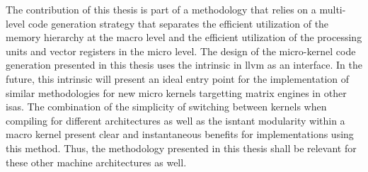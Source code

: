 \documentclass[\main/thesis.tex]{subfiles}
\begin{document}
The contribution of this thesis is part of a methodology that relies on a multi-level code generation strategy that separates the efficient utilization of the memory hierarchy at the macro level and the efficient utilization of the processing units and vector registers in the micro level.
The design of the micro-kernel code generation presented in this thesis uses the  \gls{intrinsic} in \gls{llvm} as an interface.
In the future, this intrinsic will present an ideal entry point for the implementation of similar methodologies for new micro kernels targetting matrix engines in other \glspl{isa}.
The combination of the simplicity of switching between kernels when compiling for different architectures as well as the isntant modularity within a macro kernel present clear and instantaneous benefits for implementations using this method.
Thus, the methodology presented in this thesis shall be relevant for these other machine architectures as well.
\end{document}
